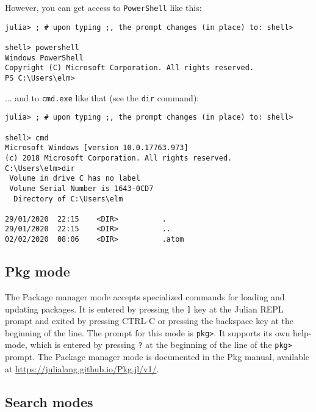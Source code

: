 However, you can get access to \texttt{PowerShell} like this:




\begin{verbatim}
julia> ; # upon typing ;, the prompt changes (in place) to: shell>

shell> powershell
Windows PowerShell
Copyright (C) Microsoft Corporation. All rights reserved.
PS C:\Users\elm>
\end{verbatim}



... and to \texttt{cmd.exe} like that (see the \texttt{dir} command):




\begin{verbatim}
julia> ; # upon typing ;, the prompt changes (in place) to: shell>

shell> cmd
Microsoft Windows [version 10.0.17763.973]
(c) 2018 Microsoft Corporation. All rights reserved.
C:\Users\elm>dir
 Volume in drive C has no label
 Volume Serial Number is 1643-0CD7
  Directory of C:\Users\elm

29/01/2020  22:15    <DIR>          .
29/01/2020  22:15    <DIR>          ..
02/02/2020  08:06    <DIR>          .atom
\end{verbatim}



\hypertarget{11775079336189571409}{}


\subsection{Pkg mode}



The Package manager mode accepts specialized commands for loading and updating packages. It is entered by pressing the \texttt{]} key at the Julian REPL prompt and exited by pressing CTRL-C or pressing the backspace key at the beginning of the line. The prompt for this mode is \texttt{pkg>}. It supports its own help-mode, which is entered by pressing \texttt{?} at the beginning  of the line of the \texttt{pkg>} prompt. The Package manager mode is documented in the Pkg manual, available at \href{https://julialang.github.io/Pkg.jl/v1/}{https://julialang.github.io/Pkg.jl/v1/}.



\hypertarget{13961930499248375782}{}


\subsection{Search modes}




